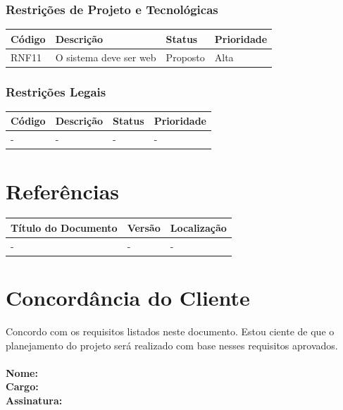 \documentclass[a4paper, 12pt]{article}
\begin{document}
\subsubsection{Restrições de Projeto e Tecnológicas}
\begin{table}[ht]
	\centering

	\begin{tabular}{p{2cm}p{7cm}p{2cm}p{2cm}}
		\hline
		\cellcolor{gray}Código&\cellcolor{gray}Descrição&\cellcolor{gray}Status&\cellcolor{gray}Prioridade  \\
		\hline
        RNF11&O sistema deve ser web&Proposto&Alta\\
		\hline
	\end{tabular}
\end{table}%
\subsubsection{Restrições Legais}
\begin{table}[ht]
	\rowcolors{1}{}{}
	\centering

	\begin{tabular}{p{2cm}p{7cm}p{2cm}p{2cm}}
		\hline
		\cellcolor{gray}Código&\cellcolor{gray}Descrição&\cellcolor{gray}Status&\cellcolor{gray}Prioridade  \\
		\hline
		-&-&-&-\\
		\hline
	\end{tabular}
\end{table}
\newpage
\section{Referências}
\begin{table}[ht]
	\centering

	\begin{tabular}{p{4cm}p{2cm}p{7.5cm}}
		\hline
		\cellcolor{gray}Título do Documento&\cellcolor{gray}Versão&\cellcolor{gray}Localização  \\
		\hline
		-&-&-\\
		\hline
	\end{tabular}
\end{table}
\section{Concordância do Cliente}
Concordo com os requisitos listados neste documento. Estou ciente de que o planejamento do projeto será realizado com base nesses requisitos aprovados.
\\\\
\textbf{Nome:}
\\
\textbf{Cargo:}
\\
\textbf{Assinatura:}
\end{document}
